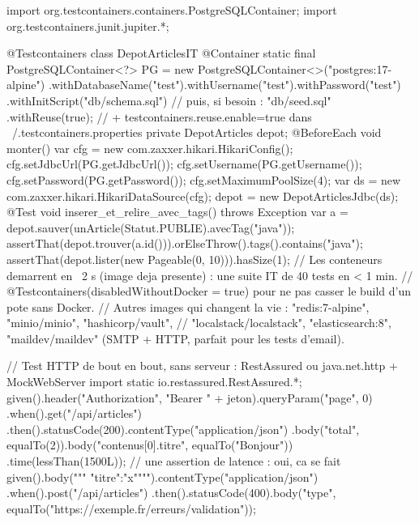 \begin{codejava}
import org.testcontainers.containers.PostgreSQLContainer;
import org.testcontainers.junit.jupiter.*;

@Testcontainers
class DepotArticlesIT {
    @Container
    static final PostgreSQLContainer<?> PG = new PostgreSQLContainer<>("postgres:17-alpine")
            .withDatabaseName("test").withUsername("test").withPassword("test")
            .withInitScript("db/schema.sql")        // puis, si besoin : "db/seed.sql"
            .withReuse(true);                       // + testcontainers.reuse.enable=true dans ~/.testcontainers.properties
    private DepotArticles depot;
    @BeforeEach void monter() {
        var cfg = new com.zaxxer.hikari.HikariConfig();
        cfg.setJdbcUrl(PG.getJdbcUrl()); cfg.setUsername(PG.getUsername()); cfg.setPassword(PG.getPassword());
        cfg.setMaximumPoolSize(4);
        var ds = new com.zaxxer.hikari.HikariDataSource(cfg);
        depot = new DepotArticlesJdbc(ds);
    }
    @Test void inserer_et_relire_avec_tags() throws Exception {
        var a = depot.sauver(unArticle(Statut.PUBLIE).avecTag("java"));
        assertThat(depot.trouver(a.id())).orElseThrow().tags().contains("java");
        assertThat(depot.lister(new Pageable(0, 10))).hasSize(1);
    }
}
// Les conteneurs demarrent en ~2 s (image deja presente) : une suite IT de 40 tests en < 1 min.
// @Testcontainers(disabledWithoutDocker = true) pour ne pas casser le build d'un pote sans Docker.
// Autres images qui changent la vie : "redis:7-alpine", "minio/minio", "hashicorp/vault",
// "localstack/localstack", "elasticsearch:8", "maildev/maildev" (SMTP + HTTP, parfait pour les tests d'email).
\end{codejava}

\begin{codejava}
// Test HTTP de bout en bout, sans serveur : RestAssured ou java.net.http + MockWebServer
import static io.restassured.RestAssured.*;
given().header("Authorization", "Bearer " + jeton).queryParam("page", 0)
   .when().get("/api/articles")
   .then().statusCode(200).contentType("application/json")
   .body("total", equalTo(2)).body("contenus[0].titre", equalTo("Bonjour"))
   .time(lessThan(1500L));                                   // une assertion de latence : oui, ca se fait
given().body("""
    {"titre":"x"}""").contentType("application/json")
   .when().post("/api/articles")
   .then().statusCode(400).body("type", equalTo("https://exemple.fr/erreurs/validation"));
\end{codejava}

